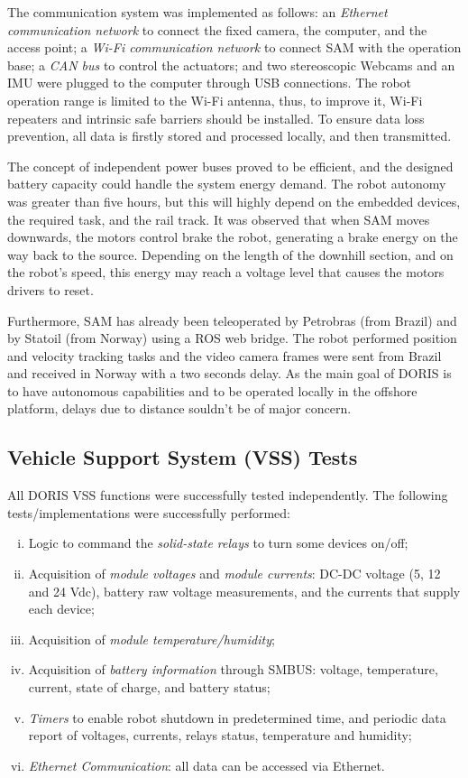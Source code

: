 \documentclass{ifacconf}
\begin{document}
The communication system was implemented as follows: an \emph{Ethernet
communication network} to connect the fixed camera, the computer, and the access
point; a \emph{Wi-Fi communication network} to connect SAM with the operation
base; a \emph{CAN bus} to control the actuators; and two stereoscopic Webcams
and an IMU were plugged to the computer through USB connections. The robot
operation range is limited to the Wi-Fi antenna, thus, to improve it, Wi-Fi
repeaters and intrinsic safe barriers should be installed. To ensure data loss
prevention, all data is firstly stored and processed locally, and then
transmitted.

The concept of independent power buses proved to be efficient, and the designed
battery capacity could handle the system energy demand. The robot autonomy was
greater than five hours, but this will highly depend on the embedded devices,
the required task, and the rail track. It was observed that when SAM moves
downwards, the motors control brake the robot, generating a brake energy on the
way back to the source. Depending on the length of the downhill section, and on
the robot’s speed, this energy may reach a voltage level that causes the motors
drivers to reset.

Furthermore, SAM has already been teleoperated by Petrobras (from Brazil) and by
Statoil (from Norway) using a ROS web bridge. The robot performed position and
velocity tracking tasks and the video camera frames were sent from Brazil and received in Norway with a two seconds
delay. As the main goal of DORIS is to have autonomous capabilities and to be
operated locally in the offshore platform, delays due to distance souldn’t be
of major concern.

\subsection{Vehicle Support System (VSS) Tests}\label{sec:VSS_tests}
All DORIS VSS functions were successfully tested independently. The following tests/implementations were successfully performed:
\begin{enumerate}[i)]
    \item Logic to command the \emph{solid-state relays} to turn some devices
    on/off;
    \item Acquisition of \emph{module voltages} and \emph{module currents}:
    DC-DC voltage (5, 12 and 24 Vdc), battery raw voltage measurements, and the
    currents that supply each device;
    \item Acquisition of \emph{module temperature/humidity};
    \item Acquisition of \emph{battery information} through SMBUS: voltage,
    temperature, current, state of charge, and battery status;
    \item \emph{Timers} to enable robot shutdown in predetermined time, and
    periodic data report of voltages, currents, relays status, temperature and
    humidity;
    \item \emph{Ethernet Communication}: all data can be accessed via Ethernet.
\end{enumerate}
\end{document}
